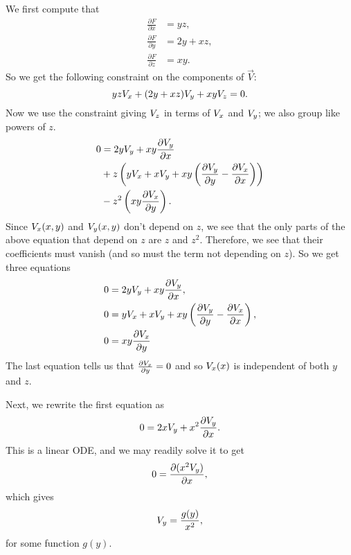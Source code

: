 We first compute that
\begin{align}
\frac{\partial F}{\partial x} & = yz, \\
\frac{\partial F}{\partial y} & = 2y + xz, \\
\frac{\partial F}{\partial z} & = xy.
\end{align}
So we get the following constraint on the components of \(\vec V\):
\begin{equation}
yzV_x + (2y + xz)V_y + xy V_z = 0.
\end{equation}
Now we use the constraint giving \(V_z\) in terms of \(V_x\) and \(V_y\); we also group like powers of \(z\).
\begin{align}
0 & = 2yV_y + xy \frac{\partial V_y}{\partial x} \\
& + z \left( yV_x + x V_y + xy \left( \frac{\partial V_y}{\partial y} 
            - \frac{\partial V_x}{\partial x} \right)\right) \\
& - z^2 \left(xy \frac{\partial V_x}{\partial y}\right).
\end{align}
Since \(V_x(x,y)\) and \(V_y(x,y)\) don't depend on \(z\), we see that the only parts of the above equation
that depend on \(z\) are \(z\) and \(z^2\). Therefore, we see that their coefficients must vanish (and so must
the term not depending on \(z\)). So we get three equations
\begin{align}
0 & = 2yV_y + xy \frac{\partial V_y}{\partial x}, \\ 
0 & = yV_x + x V_y + xy \left( \frac{\partial V_y}{\partial y} 
            - \frac{\partial V_x}{\partial x} \right), \\
0 & = xy \frac{\partial V_x}{\partial y}
\end{align}
The last equation tells us that \(\frac{\partial V_x}{\partial y} = 0\) and so \(V_x(x)\) is independent of both
\(y\) and \(z\).

Next, we rewrite the first equation as 
\begin{equation}
0 = 2xV_y + x^2 \frac{\partial V_y}{\partial x}.
\end{equation}
This is a linear ODE, and we may readily solve it to get
\begin{equation}
0 = \frac{\partial (x^2V_y)} {\partial x},
\end{equation}
which gives
\begin{equation}
V_y = \frac{g(y)}{x^2}, 
\end{equation}
for some function \(g(y)\).

